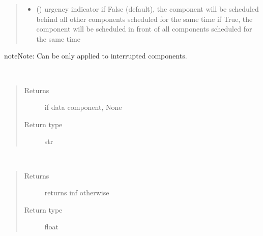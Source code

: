 \documentclass[letterpaper,10pt,english]{sphinxmanual}
\begin{document}
\begin{fulllineitems}
\begin{fulllineitems}
\begin{quote}
\begin{description}
\begin{itemize}
\item {} 
 () \textendash{} urgency indicator 
if False (default), the component will be scheduled
behind all other components scheduled
for the same time 
if True, the component will be scheduled
in front of all components scheduled
for the same time

\end{itemize}

\end{description}\end{quote}

\begin{sphinxadmonition}{note}{Note:}
Can be only applied to interrupted components. 
\end{sphinxadmonition}

\end{fulllineitems}


\begin{fulllineitems}
\label{\detokenize{Reference:salabim.Component.running_process}}~\begin{quote}\begin{description}
\item[{Returns}] \leavevmode
{} \textendash{} if data component, None

\item[{Return type}] \leavevmode
str

\end{description}\end{quote}

\end{fulllineitems}


\begin{fulllineitems}
\label{\detokenize{Reference:salabim.Component.scheduled_time}}~\begin{quote}\begin{description}
\item[{Returns}] \leavevmode
{} \textendash{} returns inf otherwise

\item[{Return type}] \leavevmode
float


\end{description}
\end{quote}
\end{fulllineitems}
\end{fulllineitems}
\end{document}
